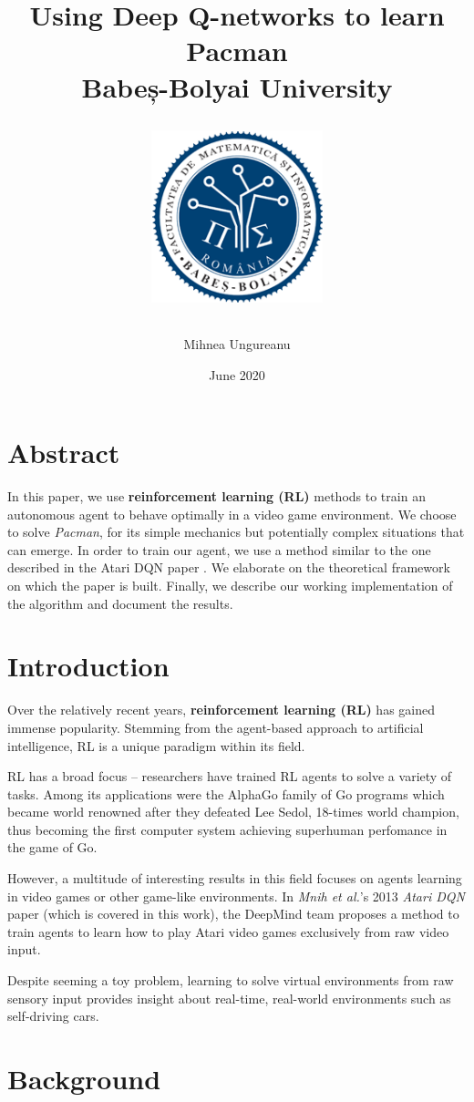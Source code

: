 \documentclass[12pt,twoside]{report}
\title{
    {Using Deep Q-networks to learn Pacman}\\
    {\large Babeș-Bolyai University}\\
    {
        \begin{figure}[h]
            \includegraphics[width=5cm]{logo_cs.png}
            \centering
        \end{figure}
    }
}
\author{Mihnea Ungureanu}
\date{June 2020}
\begin{document}
\maketitle

\chapter*{Abstract}
In this paper, we use \textbf{reinforcement learning (RL)} methods to train an autonomous agent to behave optimally in a video game environment.
We choose to solve \emph{Pacman}, for its simple mechanics but potentially complex situations that can emerge.
In order to train our agent, we use a method similar to the one described in the Atari DQN paper \cite{atari-dqn}.
We elaborate on the theoretical framework on which the paper is built.
Finally, we describe our working implementation of the algorithm and document the results.

\chapter*{Introduction}
Over the relatively recent years, \textbf{reinforcement learning (RL)} has gained immense popularity.
Stemming from the agent-based approach to artificial intelligence, RL is a unique paradigm within its field.

RL has a broad focus -- researchers have trained RL agents to solve a variety of tasks.
Among its applications were the AlphaGo family of Go programs \cite{ago, alpha-zero} which became world renowned after they defeated Lee Sedol, 18-times world champion, thus becoming the first computer system achieving superhuman perfomance in the game of Go.

However, a multitude of interesting results in this field focuses on agents learning in video games or other game-like environments.
In \emph{Mnih et al.}'s 2013 \emph{Atari DQN} paper \cite{atari-dqn} (which is covered in this work), the DeepMind team proposes a method to train agents to learn how to play Atari video games exclusively from raw video input.

Despite seeming a toy problem, learning to solve virtual environments from raw sensory input provides insight about real-time, real-world environments such as self-driving cars.

\tableofcontents

\chapter{Background}

\end{document}
